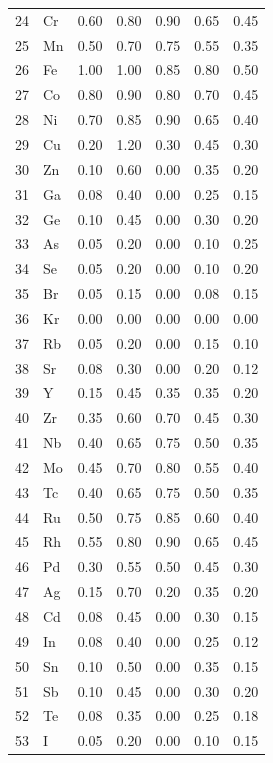 \documentclass[12pt,a4paper]{article}
\begin{document}
\begin{longtable}{p{2.2cm}p{1.2cm}p{2.2cm}p{2.2cm}p{2.2cm}p{2.2cm}p{2.2cm}}
		24 & Cr  & 0.60 & 0.80 & 0.90 & 0.65 & 0.45 \\
		25 & Mn  & 0.50 & 0.70 & 0.75 & 0.55 & 0.35 \\
		26 & Fe  & 1.00 & 1.00 & 0.85 & 0.80 & 0.50 \\
		27 & Co  & 0.80 & 0.90 & 0.80 & 0.70 & 0.45 \\
		28 & Ni  & 0.70 & 0.85 & 0.90 & 0.65 & 0.40 \\
		29 & Cu  & 0.20 & 1.20 & 0.30 & 0.45 & 0.30 \\
		30 & Zn  & 0.10 & 0.60 & 0.00 & 0.35 & 0.20 \\
		31 & Ga  & 0.08 & 0.40 & 0.00 & 0.25 & 0.15 \\
		32 & Ge  & 0.10 & 0.45 & 0.00 & 0.30 & 0.20 \\
		33 & As  & 0.05 & 0.20 & 0.00 & 0.10 & 0.25 \\
		34 & Se  & 0.05 & 0.20 & 0.00 & 0.10 & 0.20 \\
		35 & Br  & 0.05 & 0.15 & 0.00 & 0.08 & 0.15 \\
		36 & Kr  & 0.00 & 0.00 & 0.00 & 0.00 & 0.00 \\
		37 & Rb  & 0.05 & 0.20 & 0.00 & 0.15 & 0.10 \\
		38 & Sr  & 0.08 & 0.30 & 0.00 & 0.20 & 0.12 \\
		39 & Y   & 0.15 & 0.45 & 0.35 & 0.35 & 0.20 \\
		40 & Zr  & 0.35 & 0.60 & 0.70 & 0.45 & 0.30 \\
		41 & Nb  & 0.40 & 0.65 & 0.75 & 0.50 & 0.35 \\
		42 & Mo  & 0.45 & 0.70 & 0.80 & 0.55 & 0.40 \\
		43 & Tc  & 0.40 & 0.65 & 0.75 & 0.50 & 0.35 \\
		44 & Ru  & 0.50 & 0.75 & 0.85 & 0.60 & 0.40 \\
		45 & Rh  & 0.55 & 0.80 & 0.90 & 0.65 & 0.45 \\
		46 & Pd  & 0.30 & 0.55 & 0.50 & 0.45 & 0.30 \\
		47 & Ag  & 0.15 & 0.70 & 0.20 & 0.35 & 0.20 \\
		48 & Cd  & 0.08 & 0.45 & 0.00 & 0.30 & 0.15 \\
		49 & In  & 0.08 & 0.40 & 0.00 & 0.25 & 0.12 \\
		50 & Sn  & 0.10 & 0.50 & 0.00 & 0.35 & 0.15 \\
		51 & Sb  & 0.10 & 0.45 & 0.00 & 0.30 & 0.20 \\
		52 & Te  & 0.08 & 0.35 & 0.00 & 0.25 & 0.18 \\
		53 & I   & 0.05 & 0.20 & 0.00 & 0.10 & 0.15 \\

\end{longtable}
\end{document}
